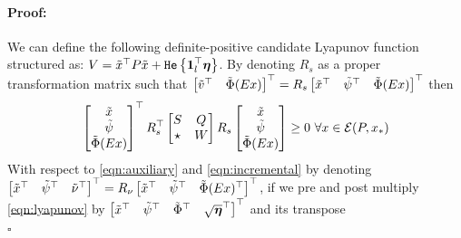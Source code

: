 \documentclass{ifacconf}
\theoremstyle{plain}
\newenvironment{proof}{\paragraph*{Proof:}}{\hfill$\square$}
\begin{document}
\begin{proof}
We can define the following definite-positive candidate Lyapunov function structured as: $V = \tilde{x}^\top P \tilde{x} + \texttt{\relax{He}}\left\{{\operatorname{\mathbf{1}}_l^\top\!\boldsymbol{\eta}}\right\}$. 
By denoting $R_s$ as a proper transformation matrix such that $\left[\begin{matrix}\tilde{v}^\top & \tilde{\Phi}(Ex)\end{matrix}\right]^\top = R_s \left[\begin{matrix}\tilde{x}^\top & \tilde{\psi}^\top & \tilde{\Phi}(Ex)\end{matrix}\right]^\top$ then
\begin{equation}\label{eqn:sector-sign}
\left[\begin{matrix}\tilde{x} \\ \tilde{\psi} \\ \tilde{\Phi}(Ex)\end{matrix}\right]^\top R_s^\top \left[\begin{matrix}S & Q \\ \star & W\end{matrix}\right] R_s \left[\begin{matrix}\tilde{x} \\ \tilde{\psi} \\ \tilde{\Phi}(Ex)\end{matrix}\right] \geq 0\ \forall x \in {\mathcal{E}}(P, x_*)
\end{equation}
With respect to \eqref{eqn:auxiliary} and \eqref{eqn:incremental} by denoting $\left[\begin{matrix}\tilde{x}^\top & \tilde{\psi}^\top & \tilde{\nu}^\top\end{matrix}\right]^\top = R_{\nu} \left[\begin{matrix}\tilde{x}^\top & \tilde{\psi}^\top & \tilde{\Phi}(Ex)^\top\end{matrix}\right]^\top$, if we pre and post multiply \eqref{eqn:lyapunov} by $\left[\begin{matrix}\tilde{x}^\top & \tilde{\psi}^\top & \tilde{\Phi}^\top & \sqrt{\boldsymbol{\eta}}^\top\end{matrix}\right]^\top$ and its transpose\\






\end{proof}
\end{document}
